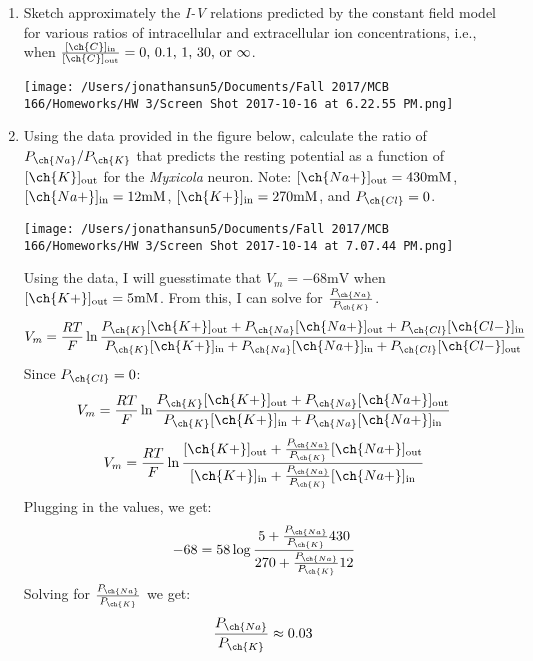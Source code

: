 \documentclass[11pt]{article}
\begin{document}
\begin{enumerate}[label=\arabic*.]
\begin{enumerate}[label=(\alph*)]
\item
Sketch approximately the \textit{I-V} relations predicted by the constant field model for various ratios of intracellular and extracellular ion concentrations, i.e., when $\frac{[\ch{C}]_{\text{in}}} {[\ch{C}]_{\text{out}}} = 0\text{, } 0.1\text{, } 1\text{, } 30\text{, or } \infty$.
\begin{center}
\texttt{[image: /Users/jonathansun5/Documents/Fall 2017/MCB 166/Homeworks/HW 3/Screen Shot 2017-10-16 at 6.22.55 PM.png]}
\end{center}



\item
Using the data provided in the figure below, calculate the ratio of $P_{\ch{Na}} / P_{\ch{K}}$ that predicts the resting potential as a function of $[\ch{K}]_{\text{out}}$ for the \textit{Myxicola} neuron. Note: $[\ch{Na+}]_{\text{out}} = 430 \text{mM}$, $[\ch{Na+}]_{\text{in}} = 12 \text{mM}$, $[\ch{K+}]_{\text{in}} = 270 \text{mM}$, and $P_{\ch{Cl}} = 0$.
\begin{center}
\texttt{[image: /Users/jonathansun5/Documents/Fall 2017/MCB 166/Homeworks/HW 3/Screen Shot 2017-10-14 at 7.07.44 PM.png]}
\end{center}
Using the data, I will guesstimate that $V_m = -68 \text{mV}$ when $[\ch{K+}]_{\text{out}} = 5 \text{mM}$. From this, I can solve for $\frac{P_{\ch{Na}}} {P_{\ch{K}}}$.
\begin{align*}
V_m = \frac{RT} {F} \ln{\frac{P_{\ch{K}}[\ch{K+}]_{\text{out}} + P_{\ch{Na}}[\ch{Na+}]_{\text{out}} + P_{\ch{Cl}}[\ch{Cl-}]_{\text{in}}} {P_{\ch{K}}[\ch{K+}]_{\text{in}} + P_{\ch{Na}}[\ch{Na+}]_{\text{in}} + P_{\ch{Cl}}[\ch{Cl-}]_{\text{out}}}}
\end{align*}
Since $P_{\ch{Cl}} = 0$:
\begin{align*}
V_m = \frac{RT} {F} \ln{\frac{P_{\ch{K}}[\ch{K+}]_{\text{out}} + P_{\ch{Na}}[\ch{Na+}]_{\text{out}}} {P_{\ch{K}}[\ch{K+}]_{\text{in}} + P_{\ch{Na}}[\ch{Na+}]_{\text{in}}}}
\end{align*}
\begin{align*}
V_m = \frac{RT} {F} \ln{\frac{[\ch{K+}]_{\text{out}} + \frac{P_{\ch{Na}}} {P_{\ch{K}}} [\ch{Na+}]_{\text{out}}} {[\ch{K+}]_{\text{in}} + \frac{P_{\ch{Na}}} {P_{\ch{K}}} [\ch{Na+}]_{\text{in}}}}
\end{align*}
Plugging in the values, we get:
\begin{align*}
-68 = 58 \log{\frac{5 + \frac{P_{\ch{Na}}} {P_{\ch{K}}} 430} {270 + \frac{P_{\ch{Na}}} {P_{\ch{K}}} 12}}
\end{align*}
Solving for $\frac{P_{\ch{Na}}} {P_{\ch{K}}}$ we get:
\begin{align*}
\frac{P_{\ch{Na}}} {P_{\ch{K}}} \approx 0.03
\end{align*}
\end{enumerate}




\end{enumerate}
\end{document}
